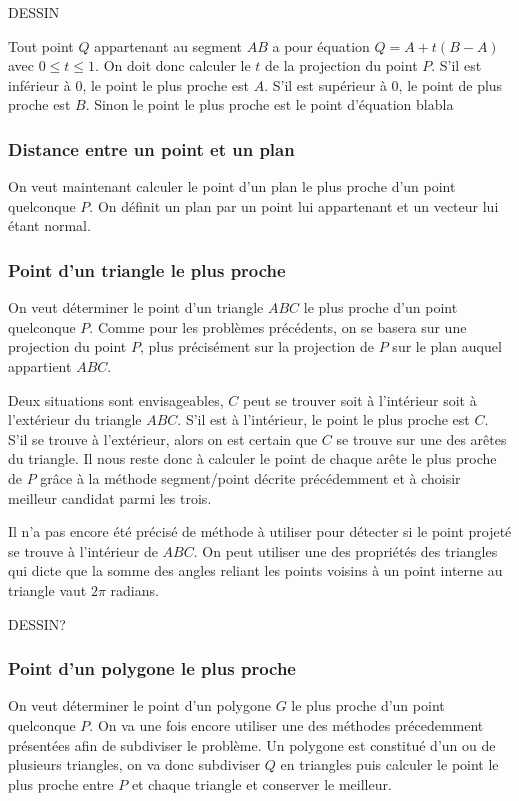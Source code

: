 DESSIN

Tout point $Q$ appartenant au segment $AB$ a pour équation $Q=A+t(B-A)$ avec $0 \leq t \leq 1$. On doit donc calculer le $t$ de la projection du point $P$. S'il est inférieur à $0$, le point le plus proche est $A$. S'il est supérieur à $0$, le point de plus proche est $B$. Sinon le point le plus proche est le point d'équation blabla

\subsubsection{Distance entre un point et un plan}

On veut maintenant calculer le point d'un plan le plus proche d'un point quelconque $P$. On définit un plan par un point lui appartenant et un vecteur lui étant normal.

\subsubsection{Point d'un triangle le plus proche}

On veut déterminer le point d'un triangle $ABC$ le plus proche d'un point quelconque $P$. Comme pour les problèmes précédents, on se basera sur une projection du point $P$, plus précisément sur la projection de $P$ sur le plan auquel appartient $ABC$.

Deux situations sont envisageables, $C$ peut se trouver soit à l'intérieur soit à l'extérieur du triangle $ABC$. S'il est à l'intérieur, le point le plus proche est $C$. S'il se trouve à l'extérieur, alors on est certain que $C$ se trouve sur une des arêtes du triangle. Il nous reste donc à calculer le point de chaque arête le plus proche de $P$ grâce à la méthode segment/point décrite précédemment et à choisir meilleur candidat parmi les trois.

Il n'a pas encore été précisé de méthode à utiliser pour détecter si le point projeté se trouve à l'intérieur de $ABC$. On peut utiliser une des propriétés des triangles qui dicte que la somme des angles reliant les points voisins à un point interne au triangle vaut $2\pi$ radians. 

DESSIN?

\subsubsection{Point d'un polygone le plus proche}

On veut déterminer le point d'un polygone $G$ le plus proche d'un point quelconque $P$. On va une fois encore utiliser une des méthodes précedemment présentées afin de subdiviser le problème. Un polygone est constitué d'un ou de plusieurs triangles, on va donc subdiviser $Q$ en triangles puis calculer le point le plus proche entre $P$ et chaque triangle et conserver le meilleur.

